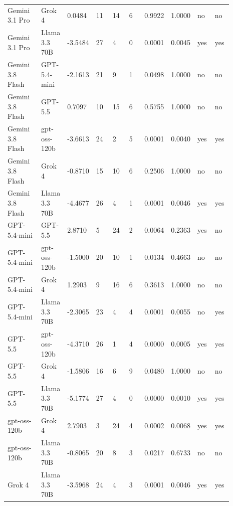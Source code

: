 \begin{landscape}
\begin{longtable}{p{0.162\linewidth}p{0.081\linewidth}p{0.081\linewidth}p{0.081\linewidth}p{0.081\linewidth}p{0.081\linewidth}p{0.081\linewidth}p{0.081\linewidth}p{0.081\linewidth}p{0.081\linewidth}}
Gemini 3.1 Pro & Grok 4 & 0.0484 & 11 & 14 & 6 & 0.9922 & 1.0000 & no & no \\
Gemini 3.1 Pro & Llama 3.3 70B & -3.5484 & 27 & 4 & 0 & 0.0001 & 0.0045 & yes & yes \\
Gemini 3.8 Flash & GPT-5.4-mini & -2.1613 & 21 & 9 & 1 & 0.0498 & 1.0000 & no & no \\
Gemini 3.8 Flash & GPT-5.5 & 0.7097 & 10 & 15 & 6 & 0.5755 & 1.0000 & no & no \\
Gemini 3.8 Flash & gpt-oss-120b & -3.6613 & 24 & 2 & 5 & 0.0001 & 0.0040 & yes & yes \\
Gemini 3.8 Flash & Grok 4 & -0.8710 & 15 & 10 & 6 & 0.2506 & 1.0000 & no & no \\
Gemini 3.8 Flash & Llama 3.3 70B & -4.4677 & 26 & 4 & 1 & 0.0001 & 0.0046 & yes & yes \\
GPT-5.4-mini & GPT-5.5 & 2.8710 & 5 & 24 & 2 & 0.0064 & 0.2363 & yes & no \\
GPT-5.4-mini & gpt-oss-120b & -1.5000 & 20 & 10 & 1 & 0.0134 & 0.4663 & no & no \\
GPT-5.4-mini & Grok 4 & 1.2903 & 9 & 16 & 6 & 0.3613 & 1.0000 & no & no \\
GPT-5.4-mini & Llama 3.3 70B & -2.3065 & 23 & 4 & 4 & 0.0001 & 0.0055 & no & yes \\
GPT-5.5 & gpt-oss-120b & -4.3710 & 26 & 1 & 4 & 0.0000 & 0.0005 & yes & yes \\
GPT-5.5 & Grok 4 & -1.5806 & 16 & 6 & 9 & 0.0480 & 1.0000 & no & no \\
GPT-5.5 & Llama 3.3 70B & -5.1774 & 27 & 4 & 0 & 0.0000 & 0.0010 & yes & yes \\
gpt-oss-120b & Grok 4 & 2.7903 & 3 & 24 & 4 & 0.0002 & 0.0068 & yes & yes \\
gpt-oss-120b & Llama 3.3 70B & -0.8065 & 20 & 8 & 3 & 0.0217 & 0.6733 & no & no \\
Grok 4 & Llama 3.3 70B & -3.5968 & 24 & 4 & 3 & 0.0001 & 0.0046 & yes & yes \\
\bottomrule
\end{longtable}
\normalsize
\end{landscape}
